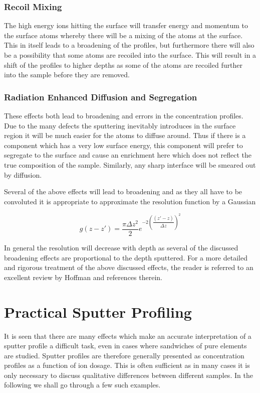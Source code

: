 \subsubsection{Recoil Mixing}
The high energy ions hitting the surface will transfer energy and momentum to the surface atoms whereby there will be a mixing of the atoms at the surface. This in itself leads to a broadening of the profiles, but furthermore there will also be a possibility that some atoms are recoiled into the surface. This will result in a shift of the profiles to higher depths as some of the atoms are recoiled further into the sample before they are removed.

\subsubsection{Radiation Enhanced Diffusion and Segregation}
These effects both lead to broadening and errors in the concentration profiles. Due to the many defects the sputtering inevitably introduces in the surface region it will be much easier for the atoms to diffuse around. Thus if there is a component which has a very low surface energy, this component will prefer to segregate to the surface and cause an enrichment here which does not reflect the true composition of the sample. Similarly, any sharp interface will be smeared out by diffusion.

Several of the above effects will lead to broadening and as they all have to be convoluted it is appropriate to approximate the resolution function by a Gaussian

\begin{equation}
g(z-z\prime)=\frac{\pi \Delta z^2}{2}e^{-2\left(\dfrac{(z\prime-z)}{\Delta z}\right)^2}
\end{equation}

In general the resolution will decrease with depth as several of the discussed broadening effects are proportional to the depth sputtered. For a more detailed and rigorous treatment of the above discussed effects, the reader is referred to an excellent review by Hoffman \cite{hoffman} and references therein.

\section{Practical Sputter Profiling}
It is seen that there are many effects which make an accurate interpretation of a sputter profile a difficult task, even in cases where sandwiches of pure elements are studied. Sputter profiles are therefore generally presented as concentration profiles as a function of ion dosage. This is often sufficient as in many cases it is only necessary to discuss qualitative differences between different samples. In the following we shall go through a few such examples.

